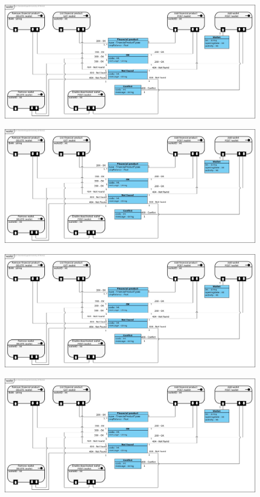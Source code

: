\documentclass[../rapport.tex]{subfiles}
\begin{document}
\begin{figure}[H]
    \includegraphics[scale=0.288]{ressources/photos_diagrammes/API/wallet.jpg}
\end{figure}

\begin{figure}[H]
    \includegraphics[scale=0.288]{ressources/photos_diagrammes/API/wallet.jpg}
\end{figure}

\begin{figure}[H]
    \includegraphics[scale=0.288]{ressources/photos_diagrammes/API/wallet.jpg}
\end{figure}

\begin{figure}[H]
    \includegraphics[scale=0.288]{ressources/photos_diagrammes/API/wallet.jpg}
\end{figure}


\newpage
\end{document}
